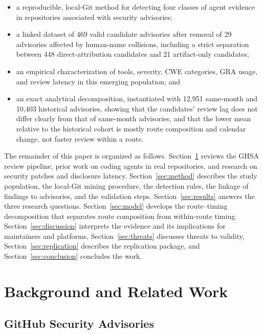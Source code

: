 \documentclass[smallextended,natbib]{svjour3}
\begin{document}
\begin{itemize}[leftmargin=1cm]
\item a reproducible, local-Git method for detecting four classes of agent
evidence in repositories associated with security advisories;
\item a linked dataset of 469 valid candidate advisories after removal of 29
advisories affected by human-name collisions, including a strict separation
between 448 direct-attribution candidates and 21 artifact-only candidates;
\item an empirical characterization of tools, severity, CWE categories, GRA
usage, and review latency in this emerging population; and
\item an exact analytical decomposition, instantiated with 12{,}951
same-month and 10{,}403 historical advisories, showing that the candidates'
review lag does not differ clearly from that of same-month advisories, and that
the lower mean relative to the historical cohort is mostly route composition
and calendar change, not faster review within a route.
\end{itemize}



The remainder of this paper is organized as follows.
Section~\ref{sec:background} reviews the GHSA review pipeline, prior work on
coding agents in real repositories, and research on security patches and
disclosure latency.  Section~\ref{sec:method} describes the study population,
the local-Git mining procedure, the detection rules, the linkage of findings to
advisories, and the validation steps.  Section~\ref{sec:results} answers the
three research questions.  Section~\ref{sec:model} develops the route--timing
decomposition that separates route composition from within-route timing.
Section~\ref{sec:discussion} interprets the evidence and its implications for
maintainers and platforms, Section~\ref{sec:threats} discusses threats to
validity, Section~\ref{sec:replication} describes the replication package,
and Section~\ref{sec:conclusion} concludes the work.

\section{Background and Related Work}
\label{sec:background}

\subsection{GitHub Security Advisories}
\end{document}

